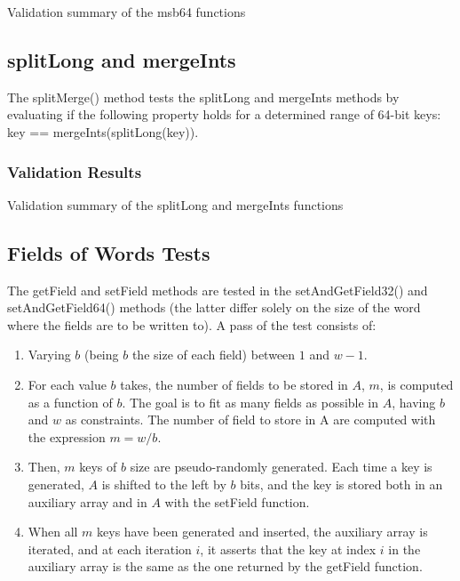 \begin{table}[H]
\centering

\caption{Validation summary of the {\ttfamily msb64} functions}
\label{tab:msb64Validation}
\end{table}



\subsection{{\ttfamily splitLong} and {\ttfamily mergeInts}}

The {\ttfamily splitMerge()} method tests the {\ttfamily splitLong} and {\ttfamily mergeInts} methods by evaluating if the following property holds for a determined range of 64-bit keys: {\ttfamily key == mergeInts(splitLong(key))}.

\subsubsection{Validation Results}

\begin{table}[H]
\centering

\caption{Validation summary of the {\ttfamily splitLong} and {\ttfamily mergeInts} functions}
\label{tab:splitMergeValidation}
\end{table}

\subsection{Fields of Words Tests}
The {\ttfamily getField} and {\ttfamily setField} methods are tested in the {\ttfamily setAndGetField32()} and {\ttfamily setAndGetField64()} methods (the latter differ solely on the size of the word where the fields are to be written to). A pass of the test consists of:
\begin{enumerate}
    \item
    Varying $b$ (being $b$ the size of each field) between $1$ and $w - 1$.
    
    \item
    For each value $b$ takes, the number of fields to be stored in $A$, $m$, is computed as a function of $b$. The goal is to fit as many fields as possible in $A$, having $b$ and $w$ as constraints. The number of field to store in A are computed with the expression $m = w / b$.
    
    \item
    Then, $m$ keys of $b$ size are pseudo-randomly generated. Each time a key is generated, $A$ is shifted to the left by $b$ bits, and the key is stored both in an auxiliary array and in $A$ with the {\ttfamily setField} function. 
    
    \item
    When all $m$ keys have been generated and inserted, the auxiliary array is iterated, and at each iteration $i$, it asserts that the key at index $i$ in the auxiliary array is the same as the one returned by the {\ttfamily getField} function.
\end{enumerate}

